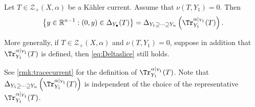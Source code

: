 \begin{lemma}\label{lma:slicepob}
    Let $T\in \mathcal{Z}_+(X,\alpha)$ be a Kähler current. Assume that $\nu(T,Y_1)=0$. Then
    \begin{equation}\label{eq:Deltaslice}
        \left\{ y\in \mathbb{R}^{n-1}: (0,y)\in \Delta_{Y_{\bullet}}(T)\right\}=\Delta_{Y_1\supseteq \cdots \supseteq Y_n}\left(\Tr^{\alpha|_{Y_1}}_{Y_1}(T)\right).
    \end{equation}

    More generally, if $T\in \mathcal{Z}_+(X,\alpha)$ and $\nu(T,Y_1)=0$, suppose in addition that $\Tr^{\alpha|_{Y_1}}_{Y_1}(T)$ is defined, then \eqref{eq:Deltaslice} still holds.
\end{lemma}
See \cref{rmk:tracecurrent} for the definition of $\Tr^{\alpha|_{Y_1}}_{Y_1}(T)$.
Note that $\Delta_{Y_1\supseteq \cdots \supseteq Y_n}\left(\Tr^{\alpha|_{Y_1}}_{Y_1}(T)\right)$ is independent of the choice of the representative $\Tr^{\alpha|_{Y_1}}_{Y_1}(T)$.
